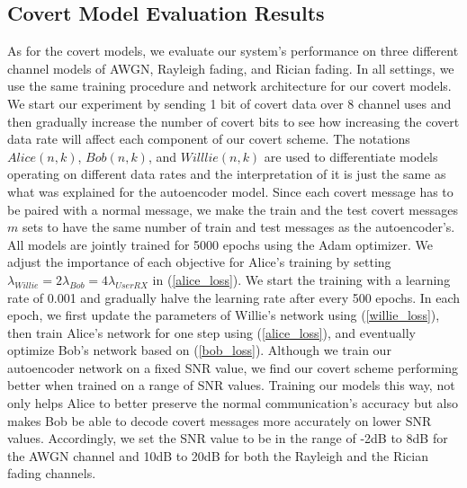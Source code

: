 \subsection{Covert Model Evaluation Results}
As for the covert models, we evaluate our system's performance on three different channel models of AWGN, Rayleigh fading, and Rician fading. In all settings, we use the same training procedure and network architecture for our covert models. We start our experiment by sending 1 bit of covert data over 8 channel uses and then gradually increase the number of covert bits to see how increasing the covert data rate will affect each component of our covert scheme. The notations \(Alice (n,k)\), \(Bob (n,k)\), and \(Willlie (n,k)\) are used to differentiate models operating on different data rates and the interpretation of it is just the same as what was explained for the autoencoder model. Since each covert message has to be paired with a normal message, we make the train and the test covert messages \(m\) sets to have the same number of train and test messages as the autoencoder's. All models are jointly trained for 5000 epochs using the Adam optimizer. We adjust the importance of each objective for Alice's training by setting \(\lambda_{Willie} = 2 \lambda_{Bob} = 4 \lambda_{UserRX}\) in (\ref{alice_loss}). We start the training with a learning rate of 0.001 and gradually halve the learning rate after every 500 epochs. In each epoch, we first update the parameters of Willie's network using (\ref{willie_loss}), then train Alice's network for one step using (\ref{alice_loss}), and eventually optimize Bob's network based on (\ref{bob_loss}). Although we train our autoencoder network on a fixed SNR value, we find our covert scheme performing better when trained on a range of SNR values. Training our models this way, not only helps Alice to better preserve the normal communication's accuracy but also makes Bob be able to decode covert messages more accurately on lower SNR values. Accordingly, we set the SNR value to be in the range of -2dB to 8dB for the AWGN channel and 10dB to 20dB for both the Rayleigh and the Rician fading channels.

